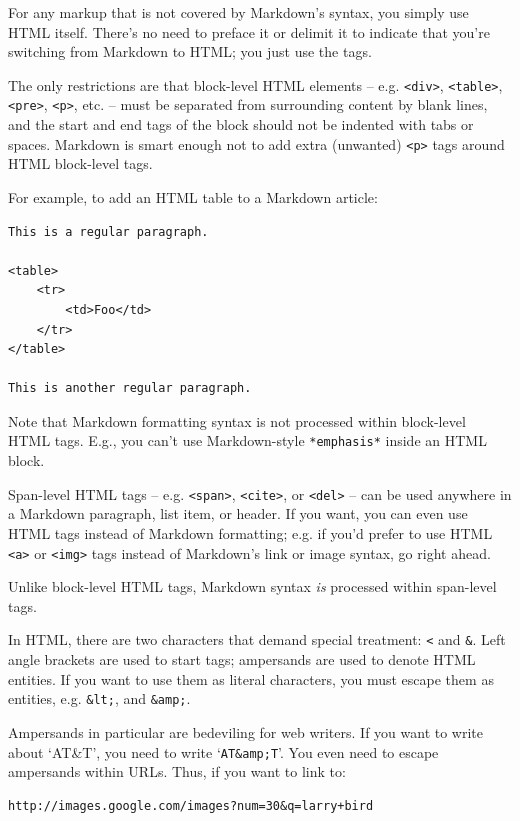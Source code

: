 For any markup that is not covered by Markdown's syntax, you simply
use HTML itself. There's no need to preface it or delimit it to
indicate that you're switching from Markdown to HTML; you just use
the tags.

The only restrictions are that block-level HTML elements -- e.g. \texttt{<div>},
\texttt{<table>}, \texttt{<pre>}, \texttt{<p>}, etc. -- must be separated from surrounding
content by blank lines, and the start and end tags of the block should
not be indented with tabs or spaces. Markdown is smart enough not
to add extra (unwanted) \texttt{<p>} tags around HTML block-level tags.

For example, to add an HTML table to a Markdown article:

\begin{verbatim}
This is a regular paragraph.

<table>
    <tr>
        <td>Foo</td>
    </tr>
</table>

This is another regular paragraph.
\end{verbatim}

Note that Markdown formatting syntax is not processed within block-level
HTML tags. E.g., you can't use Markdown-style \texttt{*emphasis*} inside an
HTML block.

Span-level HTML tags -- e.g. \texttt{<span>}, \texttt{<cite>}, or \texttt{<del>} -- can be
used anywhere in a Markdown paragraph, list item, or header. If you
want, you can even use HTML tags instead of Markdown formatting; e.g. if
you'd prefer to use HTML \texttt{<a>} or \texttt{<img>} tags instead of Markdown's
link or image syntax, go right ahead.

Unlike block-level HTML tags, Markdown syntax \emph{is} processed within
span-level tags.

In HTML, there are two characters that demand special treatment: \texttt{<}
and \texttt{\&}. Left angle brackets are used to start tags; ampersands are
used to denote HTML entities. If you want to use them as literal
characters, you must escape them as entities, e.g. \texttt{\&lt;}, and
\texttt{\&amp;}.

Ampersands in particular are bedeviling for web writers. If you want to
write about `AT\&T', you need to write `\texttt{AT\&amp;T}'. You even need to
escape ampersands within URLs. Thus, if you want to link to:

\begin{verbatim}
http://images.google.com/images?num=30&q=larry+bird
\end{verbatim}

